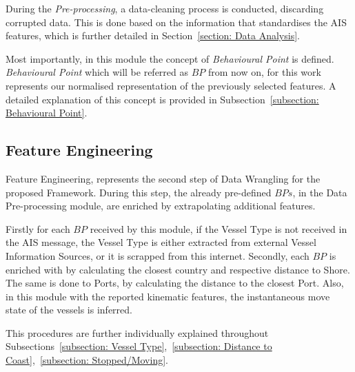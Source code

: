 During the \emph{Pre-processing}, a data-cleaning process is conducted, discarding corrupted data. This is done based on the information that standardises the AIS features, which is further detailed in Section~\ref{section: Data Analysis}.

Most importantly, in this module the concept of \emph{Behavioural Point} is defined. \emph{Behavioural Point} which will be referred as $BP$ from now on, for this work represents our normalised representation of the previously selected features. A detailed explanation of this concept is provided in Subsection~\ref{subsection: Behavioural Point}.

\subsection{Feature Engineering}
\label{subsection: 3 Feature Engineering}
Feature Engineering, represents the second step of Data Wrangling for the proposed Framework. During this step, the already pre-defined $BPs$, in the Data Pre-processing module, are enriched by extrapolating additional features. 

Firstly for each $BP$ received by this module, if the Vessel Type is not received in the AIS message, the Vessel Type is either extracted from external Vessel Information Sources, or it is scrapped from this internet.
Secondly, each $BP$ is enriched with by calculating the closest country and respective distance to Shore. The same is done to Ports, by calculating the distance to the closest Port. Also, in this module with the reported kinematic features, the instantaneous move state of the vessels is inferred.

This procedures are further individually explained throughout Subsections~\ref{subsection: Vessel Type},~\ref{subsection: Distance to Coast},~\ref{subsection: Stopped/Moving}.





